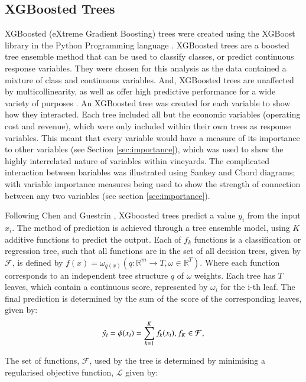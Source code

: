 \documentclass[review,12pt,authoryear]{elsarticle}
\begin{document}
\begin{linenumbers}
\subsection{XGBoosted Trees}
XGBoosted (eXtreme Gradient Boosting) trees were created using the XGBoost library \citep{chenXGBoostScalableTree2016} in the Python Programming language \citep{g.vanrossumPythonTutorialTechnical1995}. XGBoosted trees are a boosted tree ensemble method that can be used to classify classes, or predict continuous response variables. They were chosen for this analysis as the data contained a mixture of class and continuous variables. And, XGBoosted trees are unaffected by multicollinearity, as well as offer high predictive performance for a wide variety of purposes \citep{chenXGBoostScalableTree2016}. An XGBoosted tree was created for each variable to show how they interacted. Each tree included all but the economic variables (operating cost and revenue), which were only included within their own trees as response variables. This meant that every variable would have a measure of its importance to other variables (see Section \ref{sec:importance}), which was used to show the highly interrelated nature of variables within vineyards. The complicated interaction between bariables was illustrated using Sankey and Chord diagrams; with variable importance measures being used to show the strength of connection between any two variables (see section \ref{sec:importance}).
\par
Following Chen and Guestrin \citep{chenXGBoostScalableTree2016}, XGboosted trees predict a value $y_i$ from the input $x_i$. The method of prediction is achieved through a tree ensemble model, using $K$ additive functions to predict the output. Each of $f_k$ functions is a classification or regression tree, such that all functions are in the set of all decision trees, given by $\mathcal{F}$, is defined by ${f(x) = \omega_{q(x)}}(q : \mathbb{R}^m \rightarrow T, \omega \in \mathbb{R}^T)$. Where each function corresponds to an independent tree structure $q$ of $\omega$ weights. Each tree has $T$ leaves, which contain a continuous score, represented by $\omega_i$ for the i-th leaf. The final prediction is determined by the sum of the score of the corresponding leaves, given by:
\begin{equation}
 \hat{y_i}=\phi(x_i)=\sum_{k=1}^{K}{f_{k}(x_{i})}, \space f_{K}\in \mathcal{F},
\end{equation}

The set of functions, $\mathcal{F}$, used by the tree is determined by minimising a regularised objective function, $\mathcal{L}$ given by:


\end{linenumbers}
\end{document}

